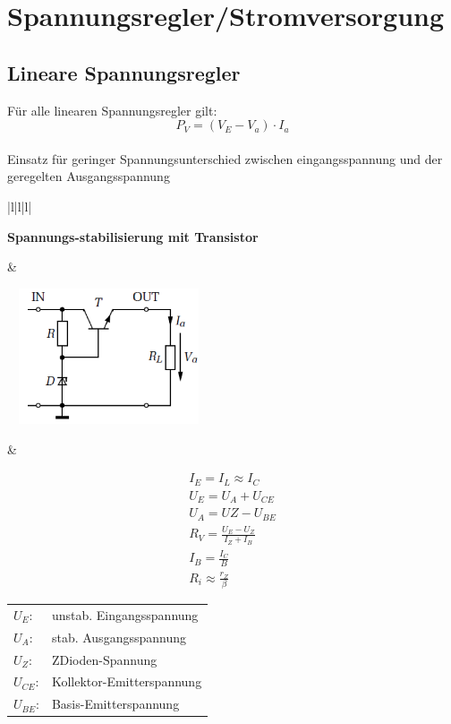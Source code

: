 \section{Spannungsregler/Stromversorgung} 
\subsection{Lineare Spannungsregler} 
Für alle linearen Spannungsregler gilt: \begin{equation*}
P_{V}=(V_{E}-V_{a}) \cdot I_{a}
\end{equation*}\\
Einsatz für geringer Spannungsunterschied zwischen eingangsspannung und der
geregelten Ausgangsspannung

\begin{longtable}{|l|l|l|}
\hline
\begin{minipage}{4cm}
\textbf{Spannungs-stabilisierung mit Transistor} 
\end{minipage}
&
\begin{minipage}{6cm}
\includegraphics[width=6cm, height =
4cm]{pictures/transistorStabilisierung}
\end{minipage}
&
\begin{minipage}{8cm}
\begin{gather*}
I_{E}=I_{L}\approx I_{C}\\
U_{E}=U_{A}+U_{CE}\\
U_{A}=U{Z}-U_{BE}\\
R_{V}=\frac{U_{E}-U_{Z}}{I_{Z}+I_{B}}\\
I_{B}=\frac{I_{C}}{B}\\
R_{i}\approx\frac{r_{Z}}{\beta} 
\end{gather*}
\begin{tabular}{ll}
$U_{E}$:&unstab. Eingangsspannung\\
$U_{A}$:&stab. Ausgangsspannung\\
$U_{Z}$:&ZDioden-Spannung\\
$U_{CE}$:&Kollektor-Emitterspannung\\
$U_{BE}$:&Basis-Emitterspannung\\

\end{tabular}
\end{minipage}
\end{longtable}
